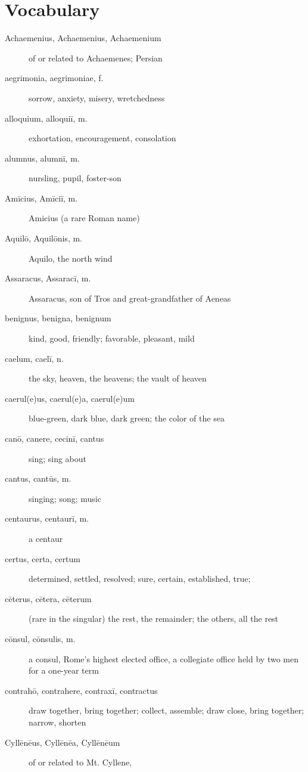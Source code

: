 \chapter*{Vocabulary}

\begin{description}
    \item[Achaemenius, Achaemenius, Achaemenium] of or related to Achaemenes;
        Persian
    \item[aegrimonia, aegrimoniae, f.] sorrow, anxiety, misery, wretchedness
    \item[alloquium, alloquiī, m.] exhortation, encouragement, consolation
    \item[alumnus, alumnī, m.] nursling, pupil, foster-son
    \item[Amīcius, Amīciī, m.] Amicius (a rare Roman name)
    \item[Aquilō, Aquilōnis, m.] Aquilo, the north wind
    \item[Assaracus, Assaracī, m.] Assaracus, son of Tros and great-grandfather
        of Aeneas
    \item[benignus, benigna, benignum] kind, good, friendly; favorable,
        pleasant, mild
    \item[caelum, caelī, n.] the sky, heaven, the heavens; the vault of heaven
    \item[caerul(e)us, caerul(e)a, caerul(e)um] blue-green, dark blue, dark
        green; the color of the sea
    \item[canō, canere, cecinī, cantus] sing; sing about
    \item[cantus, cantūs, m.] singing; song; music
    \item[centaurus, centaurī, m.] a centaur
    \item[certus, certa, certum] determined, settled, resolved; sure, certain,
        established, true;
    \item[cēterus, cētera, cēterum] (rare in the singular) the rest, the
        remainder; the others, all the rest
    \item[cōnsul, cōnsulis, m.] a consul, Rome's highest elected office,
        a collegiate office held by two men for a one-year term
    \item[contrahō, contrahere, contraxī, contractus] draw together, bring
        together; collect, assemble; draw close, bring together; narrow,
        shorten
    \item[Cyllēnēus, Cyllēnēa, Cyllēnēum] of or related to Mt. Cyllene,

\end{description}

